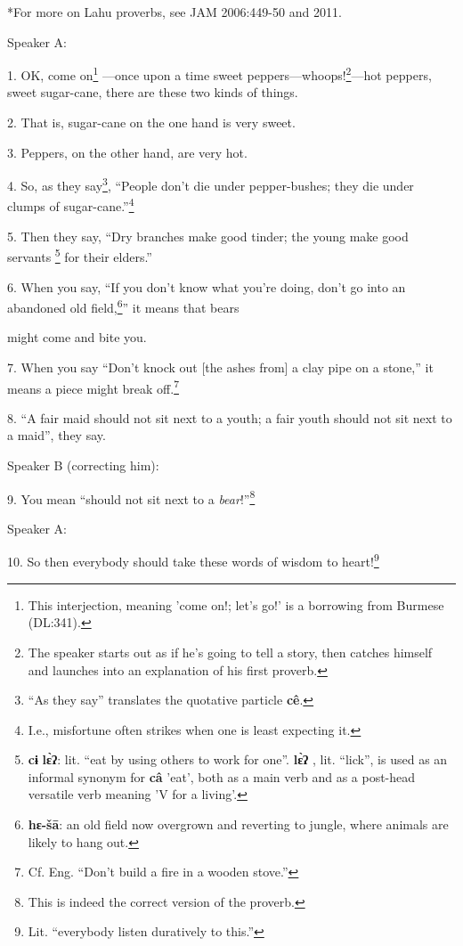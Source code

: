 \setcounter{footnote}{0}

*For more on Lahu proverbs, see JAM 2006:449-50 and 2011.

Speaker A:

1. OK, come on\footnote{This interjection, meaning 'come on!; let's go!' is a borrowing from Burmese (DL:341).} ---once upon a time sweet peppers---whoops!\footnote{The speaker starts out as if he's going to tell a story, then catches himself and launches into an explanation of his first proverb.}---hot peppers,
sweet sugar-cane, there are these two kinds of things.

2. That is, sugar-cane on the one hand is very sweet.

3. Peppers, on the other hand, are very hot.

4. So, as they say\footnote{``As they say'' translates the quotative particle \textbf{cê}.}, ``People don't die under pepper-bushes; they die under
clumps of sugar-cane.''\footnote{I.e., misfortune often strikes when one is least expecting it.}

5. Then they say, ``Dry branches make good tinder; the young make good servants
\footnote{\textbf{cɨ} \textbf{lɛ̀ʔ}: lit. ``eat by using others to work for one''. \textbf{lɛ̀ʔ} , lit. ``lick'', is used as an informal synonym for \textbf{câ} 'eat', both as a main verb and as a post-head versatile verb meaning 'V for a living'.} for their elders.''

6. When you say, ``If you don't know what you're doing, don't go into an abandoned
old field,\footnote{\textbf{hɛ-šā}: an old field now overgrown and reverting to jungle, where animals are likely to hang out.}'' it means that bears

might come and bite you.

7. When you say ``Don't knock out [the ashes from] a clay pipe on a stone,'' it
means a piece might break off.\footnote{Cf. Eng. ``Don't build a fire in a wooden stove.''}

8. ``A fair maid should not sit next to a youth; a fair youth should not sit next
to a maid'', they say.

Speaker B (correcting him):

9. You mean ``should not sit next to a \textit{bear}!''\footnote{This is indeed the correct version of the proverb.}

Speaker A:

10. So then everybody should take these words of wisdom to heart!\footnote{Lit. ``everybody listen duratively to this.''}

